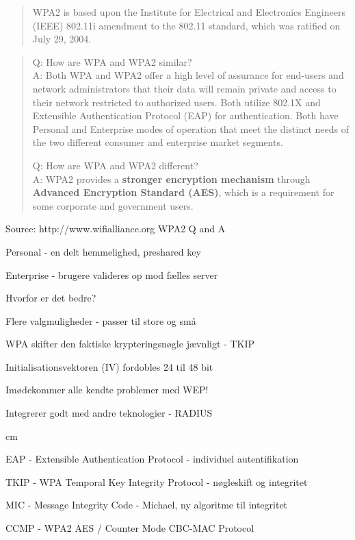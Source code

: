 \documentclass[Screen16to9,17pt]{foils}
\begin{document}

\begin{quote}
WPA2 is based upon the Institute for Electrical and Electronics
Engineers (IEEE) 802.11i amendment to the 802.11 standard, which was
ratified on July 29, 2004.
\end{quote}

\begin{quote}
Q: How are WPA and WPA2 similar?\\
A: Both WPA and WPA2 offer a high level of assurance for end-users and network
administrators that their data will remain private and access to their
network restricted to authorized users.
Both utilize 802.1X and Extensible Authentication Protocol (EAP) for
authentication. Both have Personal and Enterprise modes of operation
that meet the distinct needs of the two different consumer and
enterprise market segments.

Q: How are WPA and WPA2 different?\\
A: WPA2 provides a {\bf stronger encryption mechanism} through {\bf
  Advanced Encryption Standard (AES)}, which is a requirement for some
corporate and government users.
\end{quote}

\centerline{Source: http://www.wifialliance.org WPA2 Q and A}


\begin{list1}
\item Personal - en delt hemmelighed, preshared key
\item Enterprise - brugere valideres op mod fælles server
\item Hvorfor er det bedre?
\begin{list2}
\item Flere valgmuligheder - passer til store og små
\item WPA skifter den faktiske krypteringsnøgle jævnligt - TKIP
\item Initialisationsvektoren (IV) fordobles 24 til 48 bit
\item Imødekommer alle kendte problemer med WEP!
\item Integrerer godt med andre teknologier - RADIUS

 cm
\item EAP - Extensible Authentication Protocol - individuel autentifikation
\item TKIP - WPA Temporal Key Integrity Protocol - nøgleskift og integritet
\item MIC - Message Integrity Code - Michael, ny algoritme til integritet
\item CCMP - WPA2 AES / Counter Mode CBC-MAC Protocol
\end{list2}

\end{list1}
\end{document}
